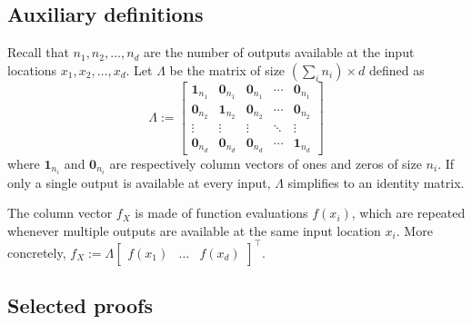 \subsection{Auxiliary definitions}
\label{sec.auxiliary_definitions}

Recall that $n_1, n_2, \dots, n_d$ are the number of outputs available at the input locations $x_1,x_2,\dots,x_d$. Let $\Lambda$ be the matrix of size $(\sum_i n_i) \times d$ defined as
\begin{equation}
	\Lambda :=
	\begin{bmatrix}
		\bm{1}_{n_1} & \bm{0}_{n_1} & \bm{0}_{n_1} & \cdots & \bm{0}_{n_1} \\
		\bm{0}_{n_2} & \bm{1}_{n_2} & \bm{0}_{n_2} & \cdots & \bm{0}_{n_2} \\
		\vdots & \vdots & \vdots & \ddots & \vdots \\ 
		\bm{0}_{n_d} & \bm{0}_{n_d} & \bm{0}_{n_d} & \cdots & \bm{1}_{n_d} 
	\end{bmatrix}
\end{equation}
where $\bm{1}_{n_i}$ and $\bm{0}_{n_i}$ are respectively column vectors of ones and zeros of size $n_i$. If only a single output is available at every input, $\Lambda$ simplifies to an identity matrix.

The column vector $f_X$ is made of function evaluations $f(x_i)$, which are repeated whenever multiple outputs are available at the same input location $x_i$. More concretely, $f_X := \Lambda \begin{bmatrix} f(x_1) & \dots & f(x_d) \end{bmatrix}^\top$.

\subsection{Selected proofs}
\label{sec.selected_derivations}

